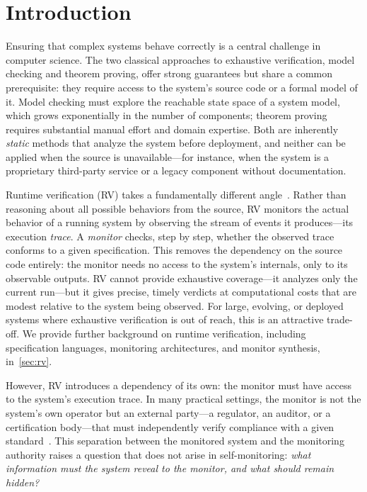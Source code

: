 \chapter{Introduction}\label{ch:intro}

Ensuring that complex systems behave correctly is a central challenge in computer science.
The two classical approaches to exhaustive verification, model checking and theorem proving, offer strong guarantees but share a common prerequisite: they require access to the system's source code or a formal model of it.
Model checking must explore the reachable state space of a system model, which grows exponentially in the number of components; theorem proving requires substantial manual effort and domain expertise.
Both are inherently \emph{static} methods that analyze the system before deployment, and neither can be applied when the source is unavailable---for instance, when the system is a proprietary third-party service or a legacy component without documentation.

Runtime verification (RV) takes a fundamentally different angle~\cite{LS09,BFFR18,HG08}.
Rather than reasoning about all possible behaviors from the source, RV monitors the actual behavior of a running system by observing the stream of events it produces---its execution \emph{trace}.
A \emph{monitor} checks, step by step, whether the observed trace conforms to a given specification.
This removes the dependency on the source code entirely: the monitor needs no access to the system's internals, only to its observable outputs.
RV cannot provide exhaustive coverage---it analyzes only the current run---but it gives precise, timely verdicts at computational costs that are modest relative to the system being observed.
For large, evolving, or deployed systems where exhaustive verification is out of reach, this is an attractive trade-off.
We provide further background on runtime verification, including specification languages, monitoring architectures, and monitor synthesis, in~\cref{sec:rv}.

However, RV introduces a dependency of its own: the monitor must have access to the system's execution trace.
In many practical settings, the monitor is not the system's own operator but an external party---a regulator, an auditor, or a certification body---that must independently verify compliance with a given standard~\cite{BFFR18, JLKWHSS16}.
This separation between the monitored system and the monitoring authority raises a question that does not arise in self-monitoring: \emph{what information must the system reveal to the monitor, and what should remain hidden?}

